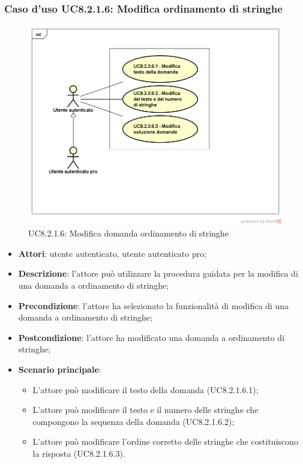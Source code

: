 \subsubsection{Caso d’uso UC8.2.1.6: Modifica ordinamento di stringhe}
	\label{UC8.2.1.6}
	\begin{figure}[h]
		\centering
		\includegraphics[scale=0.45,keepaspectratio]{UML/UC8_2_3_6.png}
		\caption{UC8.2.1.6: Modifica domanda ordinamento di stringhe}
	\end{figure}
	\FloatBarrier
\begin{itemize}
	\item\textbf{Attori}: utente autenticato, utente autenticato pro;
	\item\textbf{Descrizione}: l'attore può utilizzare la procedura guidata per la modifica di una domanda a ordinamento di stringhe;
	\item\textbf{Precondizione}: l'attore ha selezionato la funzionalità di modifica di una domanda a ordinamento di stringhe;
	\item \textbf{Postcondizione}: l'attore ha modificato una domanda a ordinamento di stringhe;
	\item\textbf{Scenario principale}:
		\begin{itemize}
			\item L'attore può modificare il testo della domanda (UC8.2.1.6.1);
			\item L'attore può modificare il testo e il numero delle stringhe che compongono la sequenza della domanda (UC8.2.1.6.2);
			\item L'attore può modificare l'ordine corretto delle stringhe che costituiscono la risposta (UC8.2.1.6.3).
		\end{itemize}
\end{itemize}

